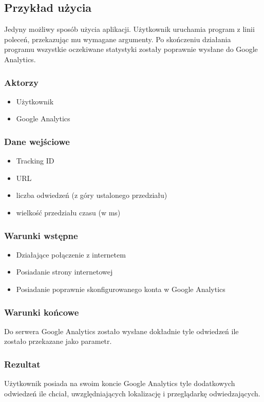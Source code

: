\documentclass{article}
\begin{document}
\subsection{Przykład użycia}
Jedyny możliwy sposób użycia aplikacji. Użytkownik uruchamia program z linii poleceń, przekazując mu wymagane argumenty. Po skończeniu działania programu wszystkie oczekiwane statystyki zostały poprawnie wysłane do Google Analytics.

\subsubsection{Aktorzy}
\begin{itemize}
\item Użytkownik
\item Google Analytics
\end{itemize}

\subsubsection{Dane wejściowe}
\begin{itemize}
\item Tracking ID
\item URL
\item liczba odwiedzeń (z góry ustalonego przedziału)
\item wielkość przedziału czasu (w ms)
\end{itemize}

\subsubsection{Warunki wstępne}
\begin{itemize}
\item Działające połączenie z internetem
\item Posiadanie strony internetowej
\item Posiadanie poprawnie skonfigurowanego konta w Google Analytics
\end{itemize}

\subsubsection{Warunki końcowe}
Do serwera Google Analytics zostało wysłane dokładnie tyle odwiedzeń ile zostało przekazane jako parametr.

\subsubsection{Rezultat}
Użytkownik posiada na swoim koncie Google Analytics tyle dodatkowych odwiedzeń ile chciał, uwzględniających lokalizację i przeglądarkę odwiedzających.
\end{document}

